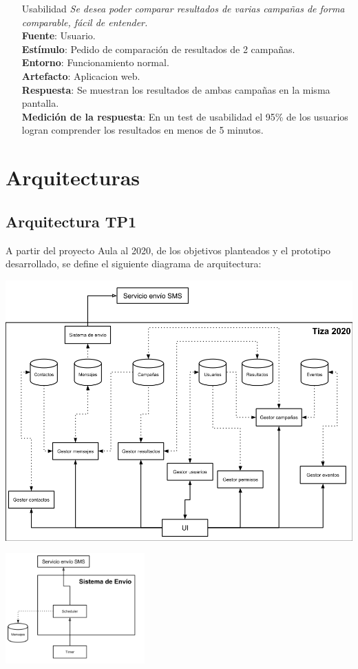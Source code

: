 \documentclass[a4paper, 11pt]{article}
\begin{document}
\begin{itemize}
\item[Usabilidad] \textit{Se desea poder comparar resultados de varias campañas de forma comparable, fácil de entender.} \\
\textbf{Fuente}: Usuario. \\
\textbf{Estímulo}: Pedido de comparación de resultados de 2 campañas. \\
\textbf{Entorno}: Funcionamiento normal. \\
\textbf{Artefacto}: Aplicacion web. \\
\textbf{Respuesta}: Se muestran los resultados de ambas campañas en la misma pantalla. \\
\textbf{Medición de la respuesta}: En un test de usabilidad el 95\% de los usuarios logran comprender los resultados en menos de 5 minutos. \\

\end{itemize}

\newpage

\section{Arquitecturas}
\subsection{Arquitectura TP1}
A partir del proyecto Aula al 2020, de los objetivos planteados y el prototipo desarrollado, se define el siguiente diagrama de arquitectura:

\centerline{\includegraphics[width=1\textwidth]{./diagramas/ArquitecturaTP1.png}}
\centerline{\includegraphics[width=0.4\textwidth]{./diagramas/ArqTP1SistEnvio.png}}
\end{document}
